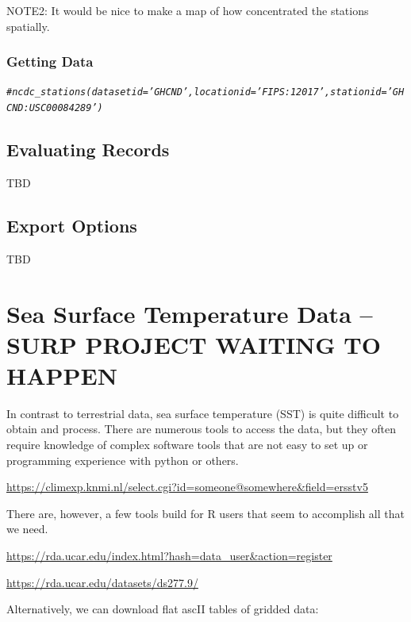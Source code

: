 \documentclass{article}\usepackage[]{graphicx}\usepackage[]{xcolor}
\makeatletter
\newcommand{\hlcom}[1]{\textcolor[rgb]{0.678,0.584,0.686}{\textit{#1}}}%
\newenvironment{kframe}{%
 \def\at@end@of@kframe{}%
 \ifinner\ifhmode%
  \def\at@end@of@kframe{\end{minipage}}%
  \begin{minipage}{\columnwidth}%
 \fi\fi%
 \def\FrameCommand##1{\hskip\@totalleftmargin \hskip-\fboxsep
 \colorbox{shadecolor}{##1}\hskip-\fboxsep
     \hskip-\linewidth \hskip-\@totalleftmargin \hskip\columnwidth}%
 \MakeFramed {\advance\hsize-\width
   \@totalleftmargin\z@ \linewidth\hsize
   \@setminipage}}%
 {\par\unskip\endMakeFramed%
 \at@end@of@kframe}
\newenvironment{knitrout}{}{} %
\makeatother
\begin{document}
NOTE2: It would be nice to make a map of how concentrated the stations spatially. 

\subsubsection{Getting Data}

\begin{knitrout}
\color{fgcolor}\begin{kframe}
\begin{alltt}
\hlcom{#ncdc_stations(datasetid='GHCND', locationid='FIPS:12017', stationid='GHCND:USC00084289')}
\end{alltt}
\end{kframe}
\end{knitrout}

\subsection{Evaluating Records}

TBD

\subsection{Export Options}

TBD

\section{Sea Surface Temperature Data -- SURP PROJECT WAITING TO HAPPEN}

In contrast to terrestrial data, sea surface temperature (SST) is quite difficult to obtain and process. There are numerous tools to access the data, but they often require knowledge of complex software tools that are not easy to set up or programming experience with python or others.

\url{https://climexp.knmi.nl/select.cgi?id=someone@somewhere&field=ersstv5}

There are, however, a few tools build for R users that seem to accomplish all that we need. 

\url{https://rda.ucar.edu/index.html?hash=data_user&action=register}

\url{https://rda.ucar.edu/datasets/ds277.9/}

Alternatively, we can download flat ascII tables of gridded data:
\end{document}
